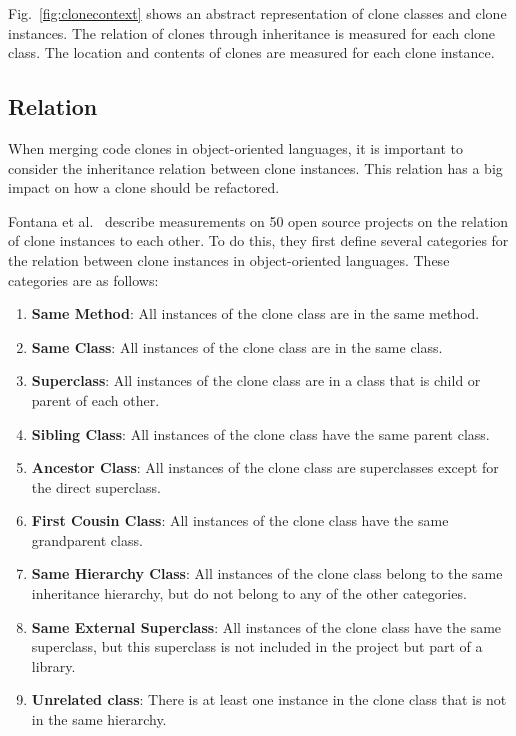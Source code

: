 Fig.~\ref{fig:clonecontext} shows an abstract representation of clone classes and clone instances. The relation of clones through inheritance is measured for each clone class. The location and contents of clones are measured for each clone instance.

\subsection{Relation}\label{sec:setuprelation}
When merging code clones in object-oriented languages, it is important to consider the inheritance relation between clone instances. This relation has a big impact on how a clone should be refactored.

Fontana et al.~\cite{fontana2015duplicated} describe measurements on 50 open source projects on the relation of clone instances to each other. To do this, they first define several categories for the relation between clone instances in object-oriented languages. These categories are as follows:
\begin{enumerate}
  \item \textbf{Same Method}: All instances of the clone class are in the same method.
  \item \textbf{Same Class}: All instances of the clone class are in the same class.
  \item \textbf{Superclass}: All instances of the clone class are in a class that is child or parent of each other.
  \item \textbf{Sibling Class}: All instances of the clone class have the same parent class.
    \item \textbf{Ancestor Class}: All instances of the clone class are superclasses except for the direct superclass.
  \item \textbf{First Cousin Class}: All instances of the clone class have the same grandparent class.
\item \textbf{Same Hierarchy Class}: All instances of the clone class belong to the same inheritance hierarchy, but do not belong to any of the other categories.
\item \textbf{Same External Superclass}: All instances of the clone class have the same superclass, but this superclass is not included in the project but part of a library.
\item \textbf{Unrelated class}: There is at least one instance in the clone class that is not in the same hierarchy.
\end{enumerate}

